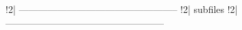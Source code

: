 !2| --------------------------------------------------
!2| {subfiles}
!2| --------------------------------------------------

\usepackage{subfiles}
